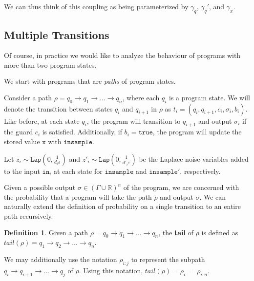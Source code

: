 \documentclass[12pt]{article}
\newcommand{\RR}{\mathbb{R}}
\newcommand{\Lap}{\texttt{Lap}}
\theoremstyle{definition}
\newtheorem{defn}[thm]{Definition}
\begin{document}
We can thus think of this coupling as being parameterized by $\gamma_q$, $\gamma_q'$, and $\gamma_x$. 

\subsection{Multiple Transitions}

Of course, in practice we would like to analyze the behaviour of programs with more than two program states.

We start with programs that are \textit{paths} of program states. 

Consider a path $\rho = q_0\to q_1\to \ldots \to q_n$, where each $q_i$ is a program state. We will denote the transition between states $q_i$ and $q_{i+1}$ in $\rho$ as $t_i = (q_i, q_{i+1}, c_i, \sigma_i, b_i)$.
Like before, at each state $q_i$, the program will transition to $q_{i+1}$ and output $\sigma_i$ if the guard $c_i$ is satisfied. Additionally, if $b_i=\texttt{true}$, the program will update the stored value $\texttt{x}$ with $\texttt{insample}$. 

Let $z_i \sim \Lap(0, \frac{1}{d_i\varepsilon})$ and $z'_i \sim \Lap(0, \frac{1}{d'_i\varepsilon})$ be the Laplace noise variables added to the input $\texttt{in}_i$ at each state for $\texttt{insample}$ and $\texttt{insample}'$, respectively. 

Given a possible output $\sigma\in (\Gamma\cup\RR)^n$ of the program, we are concerned with the probability that a program will take the path $\rho$ and output $\sigma$. We can naturally  extend the definition of probability on a single transition to an entire path recursively.

\begin{defn}
    Given a path $\rho = q_0\to q_1\to \ldots \to q_n$, the \textbf{tail} of $\rho$ is defined as $tail(\rho) = q_1\to q_2 \to \ldots\to q_n$. 

    We may additionally use the notation $\rho_{i:j}$ to represent the subpath $q_i\to q_{i+1}\to \ldots \to q_j$ of $\rho$. Using this notation, $tail(\rho) = \rho_{i:} = \rho_{i:n}$.
\end{defn}
\end{document}
